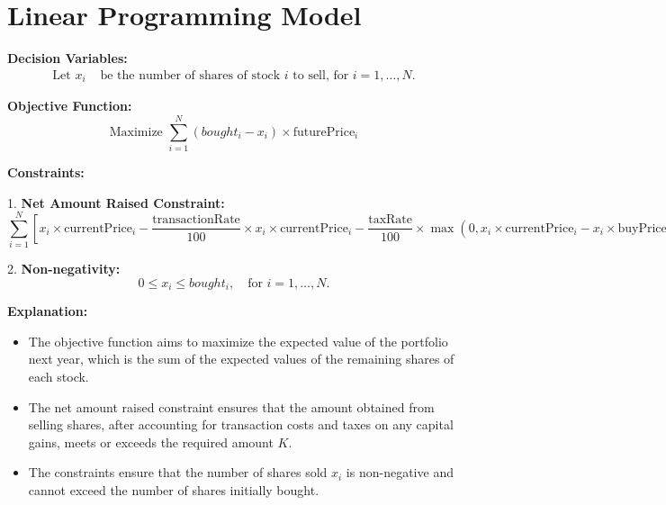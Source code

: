 \documentclass{article}
\begin{document}
\section*{Linear Programming Model}

\textbf{Decision Variables:}
\begin{align*}
\text{Let } x_i & \text{ be the number of shares of stock } i \text{ to sell, for } i = 1, \ldots, N.
\end{align*}

\textbf{Objective Function:}
\[
\text{Maximize } \sum_{i=1}^{N} (bought_i - x_i) \times \text{futurePrice}_i
\]

\textbf{Constraints:}

1. \textbf{Net Amount Raised Constraint:}
\[
\sum_{i=1}^{N} \left[ x_i \times \text{currentPrice}_i - \frac{\text{transactionRate}}{100} \times x_i \times \text{currentPrice}_i - \frac{\text{taxRate}}{100} \times \max(0, x_i \times \text{currentPrice}_i - x_i \times \text{buyPrice}_i) \right] \geq K
\]

2. \textbf{Non-negativity:}
\[
0 \leq x_i \leq bought_i, \quad \text{for } i = 1, \ldots, N.
\]

\textbf{Explanation:}
\begin{itemize}
    \item The objective function aims to maximize the expected value of the portfolio next year, which is the sum of the expected values of the remaining shares of each stock.
    \item The net amount raised constraint ensures that the amount obtained from selling shares, after accounting for transaction costs and taxes on any capital gains, meets or exceeds the required amount \( K \).
    \item The constraints ensure that the number of shares sold \( x_i \) is non-negative and cannot exceed the number of shares initially bought.
\end{itemize}
\end{document}

